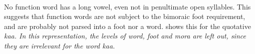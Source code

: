  \\

No function word has a long vowel, even not in penultimate open syllables. This suggests that function words are not subject to the bimoraic foot requirement, and are probably not parsed into a foot nor a word.  shows this for the quotative \em ka\dentt a\em. In this representation, the levels of word, foot and mora are left out, since they are irrelevant for the word \em ka\dentt a\em. 

